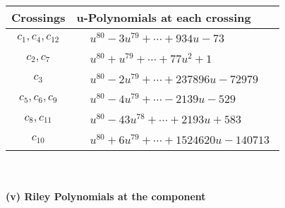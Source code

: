 \documentclass[1p]{elsarticle_modified}
\theoremstyle{definition}
\begin{document}
\begin{tabular}{m{50pt}|m{274pt}}
Crossings & \hspace{64pt}u-Polynomials at each crossing \\
\hline $$\begin{aligned}c_{1},c_{4},c_{12}\end{aligned}$$&$\begin{aligned}
&u^{80}-3 u^{79}+\cdots+934 u-73
\end{aligned}$\\
\hline $$\begin{aligned}c_{2},c_{7}\end{aligned}$$&$\begin{aligned}
&u^{80}+u^{79}+\cdots+77 u^2+1
\end{aligned}$\\
\hline $$\begin{aligned}c_{3}\end{aligned}$$&$\begin{aligned}
&u^{80}-2 u^{79}+\cdots+237896 u-72979
\end{aligned}$\\
\hline $$\begin{aligned}c_{5},c_{6},c_{9}\end{aligned}$$&$\begin{aligned}
&u^{80}-4 u^{79}+\cdots-2139 u-529
\end{aligned}$\\
\hline $$\begin{aligned}c_{8},c_{11}\end{aligned}$$&$\begin{aligned}
&u^{80}-43 u^{78}+\cdots+2193 u+583
\end{aligned}$\\
\hline $$\begin{aligned}c_{10}\end{aligned}$$&$\begin{aligned}
&u^{80}+6 u^{79}+\cdots+1524620 u-140713
\end{aligned}$\\
\hline
\end{tabular}\\~\\
\newpage\renewcommand{\arraystretch}{1}
\flushleft \textbf{(v) Riley Polynomials at the component}\newline \\
\end{document}
